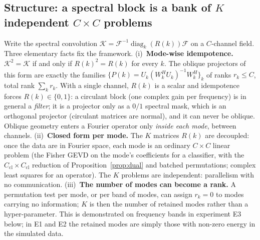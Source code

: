 \documentclass[11pt,a4paper]{article}
\theoremstyle{plain}
\theoremstyle{definition}
\theoremstyle{remark}
\newcommand{\diag}{\operatorname{diag}}
\begin{document}
\subsection{Structure: a spectral block is a bank of \texorpdfstring{$K$}{K} independent \texorpdfstring{$C\times C$}{CxC} problems}
Write the spectral convolution $\mathcal K=\mathcal F^{-1}\diag_k(R(k))\mathcal F$
on a $C$-channel field. Three elementary facts fix the framework.
(i)~\textbf{Mode-wise idempotence.} $\mathcal K^2=\mathcal K$ if and only if
$R(k)^2=R(k)$ for every $k$. The oblique projectors of this form are exactly
the families $\{P(k)=U_k(W_k^HU_k)^{-1}W_k^H\}_k$ of ranks $r_k\le C$, total
rank $\sum_kr_k$. With a single channel, $R(k)$ is a scalar and idempotence
forces $R(k)\in\{0,1\}$: a circulant block (one complex gain per frequency)
is in general a \emph{filter}; it is a projector only as a $0/1$ spectral
mask, which is an orthogonal projector (circulant matrices are normal), and
it can never be oblique. Oblique geometry enters a Fourier operator only
\emph{inside each mode}, between channels.
(ii)~\textbf{Closed form per mode.} The $K$ matrices $R(k)$ are decoupled:
once the data are in Fourier space, each mode is an ordinary $C\times C$
linear problem (the Fisher GEVD on the mode's coefficients for a classifier,
with the $C_{\mathrm{cl}}\times C_{\mathrm{cl}}$ reduction of
Proposition~\ref{prop:dual} and batched permutations; complex least squares
for an operator). The $K$ problems are independent: parallelism with no
communication. (iii)~\textbf{The number of modes can become a rank.} A
permutation test per mode, or per band of modes, can assign $r_k=0$ to modes
carrying no information; $K$ is then the number of retained modes rather
than a hyper-parameter. This is demonstrated on frequency bands in
experiment E3 below; in E1 and E2 the retained modes are simply those with
non-zero energy in the simulated data.
\end{document}
